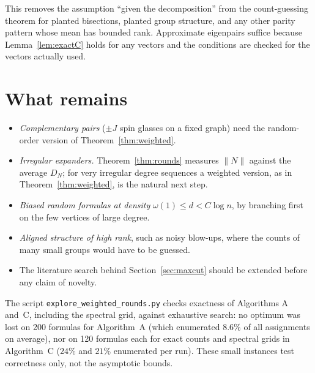 \documentclass[11pt,a4paper]{article}
\theoremstyle{definition}
\theoremstyle{remark}
\begin{document}
This removes the assumption ``given the decomposition'' from the count-guessing
theorem for planted bisections, planted group structure, and any other parity
pattern whose mean has bounded rank. Approximate eigenpairs suffice because
Lemma~\ref{lem:exactC} holds for any vectors and the conditions are checked for
the vectors actually used.

\section{What remains}\label{sec:remains}

\begin{itemize}
\item \emph{Complementary pairs} ($\pm J$ spin glasses on a fixed graph) need the
random-order version of Theorem~\ref{thm:weighted}.
\item \emph{Irregular expanders.} Theorem~\ref{thm:rounds} measures $\|N\|$ against
the average $D_N$; for very irregular degree sequences a weighted version, as in
Theorem~\ref{thm:weighted}, is the natural next step.
\item \emph{Biased random formulas at density} $\omega(1)\le d<C\log n$, by
branching first on the few vertices of large degree.
\item \emph{Aligned structure of high rank}, such as noisy blow-ups, where the
counts of many small groups would have to be guessed.
\item The literature search behind Section~\ref{sec:maxcut} should be extended
before any claim of novelty.
\end{itemize}
The script \texttt{explore\_weighted\_rounds.py} checks exactness of Algorithms
A and~C, including the spectral grid, against exhaustive search: no optimum was
lost on 200 formulas for Algorithm~A (which enumerated $8.6\%$ of all assignments
on average), nor on 120 formulas each for exact counts and spectral grids in
Algorithm~C ($24\%$ and $21\%$ enumerated per run). These small instances test
correctness only, not the asymptotic bounds.
\end{document}
